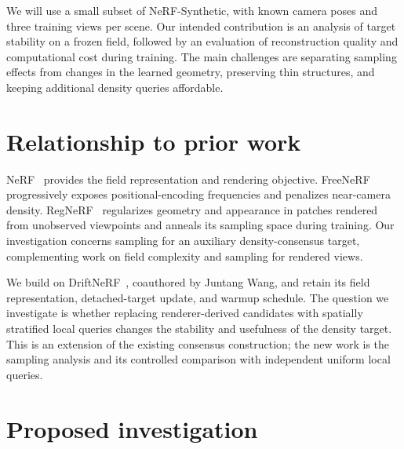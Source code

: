 \documentclass[sigconf,nonacm]{acmart}
\begin{document}
We will use a small subset of NeRF-Synthetic, with known camera poses and three training views per scene. Our intended contribution is an analysis of target stability on a frozen field, followed by an evaluation of reconstruction quality and computational cost during training. The main challenges are separating sampling effects from changes in the learned geometry, preserving thin structures, and keeping additional density queries affordable.

\section{Relationship to prior work}\label{sec:related}

NeRF~\citep{mildenhall2020nerf} provides the field representation and rendering objective. FreeNeRF~\citep{yang2023freenerf} progressively exposes positional-encoding frequencies and penalizes near-camera density. RegNeRF~\citep{niemeyer2022regnerf} regularizes geometry and appearance in patches rendered from unobserved viewpoints and anneals its sampling space during training. Our investigation concerns sampling for an auxiliary density-consensus target, complementing work on field complexity and sampling for rendered views.

We build on DriftNeRF~\citep{wang2026driftnerf}, coauthored by Juntang Wang, and retain its field representation, detached-target update, and warmup schedule. The question we investigate is whether replacing renderer-derived candidates with spatially stratified local queries changes the stability and usefulness of the density target. This is an extension of the existing consensus construction; the new work is the sampling analysis and its controlled comparison with independent uniform local queries.

\clearpage
\section{Proposed investigation}\label{sec:method}
\end{document}
